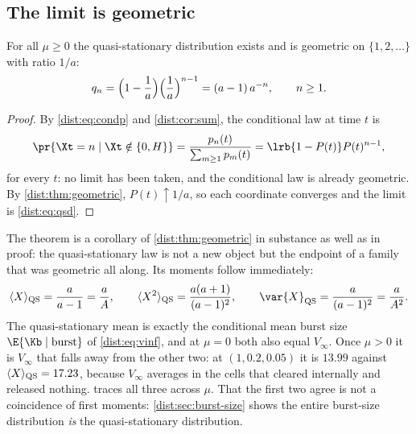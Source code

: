 \subsection{The limit is geometric}
\label{dist:sec:qsd-geometric}

\begin{theorem}
\label{dist:thm:qsd}
For all $\mu\ge0$ the quasi-stationary distribution exists and is geometric
on $\{1,2,\ldots\}$ with ratio $1/a$:
\begin{equation}
q_n=\Bigl(1-\frac{1}{a}\Bigr)\Bigl(\frac{1}{a}\Bigr)^{n-1}
=(a-1)\,a^{-n},\qquad n\ge1.
\label{dist:eq:qsd}
\end{equation}
\end{theorem}

\begin{proof}
By \cref{dist:eq:condp} and \cref{dist:cor:sum}, the conditional law at time
$t$ is
\begin{equation}
\pr{\Xt=n\mid\Xt\notin\{0,H\}}
=\frac{p_n(t)}{\sum_{m\ge1}p_m(t)}
=\lrb{1-P(t)}P(t)^{n-1},
\label{dist:eq:condgeom}
\end{equation}
for every $t$: no limit has been taken, and the conditional law is already
geometric. By \cref{dist:thm:geometric}, $P(t)\uparrow1/a$, so each
coordinate converges and the limit is \cref{dist:eq:qsd}.
\end{proof}

The theorem is a corollary of \cref{dist:thm:geometric} in substance as well
as in proof: the quasi-stationary law is not a new object but the endpoint of
a family that was geometric all along. Its moments follow immediately:
\begin{equation}
\langle X\rangle_{\rm QS}=\frac{a}{a-1}=\frac{a}{A},
\qquad
\langle X^2\rangle_{\rm QS}=\frac{a(a+1)}{(a-1)^2},
\qquad
\var{X}_{\rm QS}=\frac{a}{(a-1)^2}=\frac{a}{A^2}.
\label{dist:eq:qsmoments}
\end{equation}
The quasi-stationary mean is exactly the conditional mean burst size
$\E{\Kb\mid\text{burst}}$ of \cref{dist:eq:vinf}, and at $\mu=0$ both also
equal $V_\infty$. Once $\mu>0$ it is $V_\infty$ that falls away from the other
two: at $(1,0.2,0.05)$ it is $13.99$ against
$\langle X\rangle_{\rm QS}=17.23$, because $V_\infty$ averages in the cells
that cleared internally and released nothing.  traces
all three across $\mu$. That the first two agree is not a coincidence of first
moments: \cref{dist:sec:burst-size} shows the entire burst-size distribution
\emph{is} the quasi-stationary distribution.

